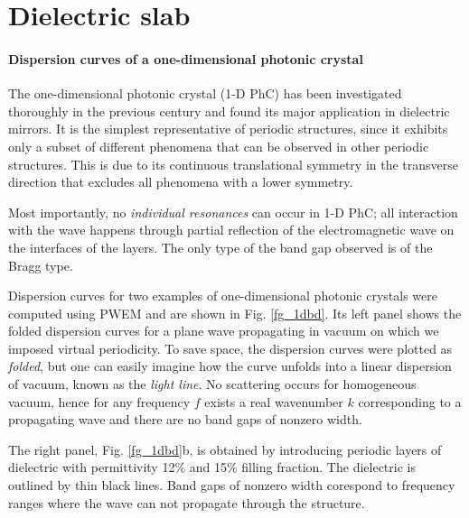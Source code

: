 \label{chapter_results}
\section{Dielectric slab} \label{section_Dielectric slab}
\paragraph{Dispersion curves of a one-dimensional photonic crystal}%
The one-dimensional photonic crystal (1-D PhC) has been investigated thoroughly in the previous century and found its major application in dielectric mirrors. It is the simplest representative of periodic structures, since  it exhibits only a subset of different phenomena that can be observed in other periodic structures. This is due to its continuous translational symmetry in the transverse direction that excludes all phenomena with a lower symmetry. 

Most importantly, no \textit{individual resonances} can occur in 1-D PhC; all interaction with the wave happens through partial reflection of the electromagnetic wave on the interfaces of the layers. The only type of the band gap observed is of the Bragg type.

Dispersion curves for two examples of one-dimensional photonic crystals were computed using PWEM and are shown in Fig. \ref{fg_1dbd}. 
Its left panel shows the folded dispersion curves for a plane wave propagating in vacuum on which we imposed virtual periodicity. To save space, the dispersion curves were plotted as \textit{folded}, but one can easily imagine how the curve unfolds into a linear dispersion of vacuum, known as the \textit{light line}. No scattering occurs for homogeneous vacuum, hence for any frequency $f$ exists a real wavenumber $k$ corresponding to a propagating wave and there are no band gaps of nonzero width. 

The right panel, Fig. \ref{fg_1dbd}b, is obtained by introducing periodic layers of dielectric with permittivity 12\% and 15\% filling fraction. The dielectric is outlined by thin black lines. Band gaps of nonzero width corespond to frequency ranges where the wave can not propagate through the structure. %


